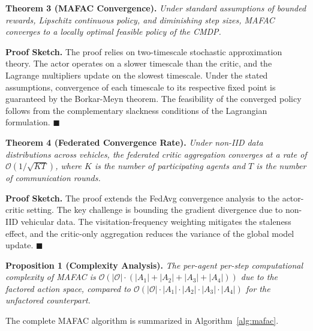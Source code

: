 \documentclass[journal]{IEEEtran}
\begin{document}
\textbf{Theorem 3 (MAFAC Convergence).} \emph{Under standard assumptions of bounded rewards, Lipschitz continuous policy, and diminishing step sizes, MAFAC converges to a locally optimal feasible policy of the CMDP.}

\textbf{Proof Sketch.} The proof relies on two-timescale stochastic approximation theory. The actor operates on a slower timescale than the critic, and the Lagrange multipliers update on the slowest timescale. Under the stated assumptions, convergence of each timescale to its respective fixed point is guaranteed by the Borkar-Meyn theorem. The feasibility of the converged policy follows from the complementary slackness conditions of the Lagrangian formulation. \hfill $\blacksquare$

\textbf{Theorem 4 (Federated Convergence Rate).} \emph{Under non-IID data distributions across vehicles, the federated critic aggregation converges at a rate of $\mathcal{O}(1/\sqrt{KT})$, where $K$ is the number of participating agents and $T$ is the number of communication rounds.}

\textbf{Proof Sketch.} The proof extends the FedAvg convergence analysis to the actor-critic setting. The key challenge is bounding the gradient divergence due to non-IID vehicular data. The visitation-frequency weighting mitigates the staleness effect, and the critic-only aggregation reduces the variance of the global model update. \hfill $\blacksquare$

\textbf{Proposition 1 (Complexity Analysis).} \emph{The per-agent per-step computational complexity of MAFAC is $\mathcal{O}(|\mathcal{O}| \cdot (|A_1| + |A_2| + |A_3| + |A_4|))$ due to the factored action space, compared to $\mathcal{O}(|\mathcal{O}| \cdot |A_1| \cdot |A_2| \cdot |A_3| \cdot |A_4|)$ for the unfactored counterpart.}

The complete MAFAC algorithm is summarized in Algorithm~\ref{alg:mafac}.
\end{document}
